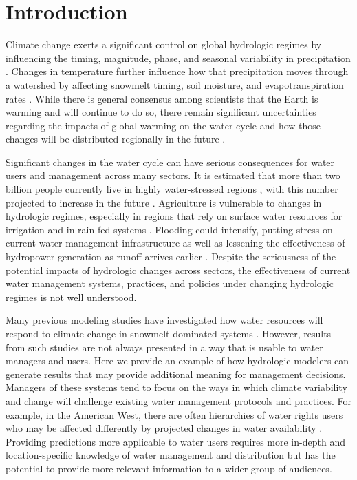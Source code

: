 \documentclass[water,article,submit,moreauthors,pdftex,10pt,a4paper]{mdpi}
\theoremstyle{mdpi}
\newcounter{ex}
\newcounter{re}
\theoremstyle{mdpidefinition}
\begin{document}


\section{Introduction}
Climate change exerts a significant control on global hydrologic regimes by influencing the timing, magnitude, phase, and seasonal variability in precipitation \citep{Mote:2005bv,Regonda:2005bl,Knowles:2006jc,Haddeland:2014kx}. Changes in temperature further influence how that precipitation moves through a watershed by affecting snowmelt timing, soil moisture, and evapotranspiration rates \citep{Barnett:2005ci,Li:2017jn}. While there is general consensus among scientists that the Earth is warming and will continue to do so, there remain significant uncertainties regarding the impacts of global warming on the water cycle and how those changes will be distributed regionally in the future \citep{Huntington:2006tl,Turral:2011uj}.

Significant changes in the water cycle can have serious consequences for water users and management across many sectors. It is estimated that more than two billion people currently live in highly water-stressed regions \citep{Oki:2006cu}, with this number projected to increase in the future \citep{Schewe:2014er}. Agriculture is vulnerable to changes in hydrologic regimes, especially in regions that rely on surface water resources for irrigation and in rain-fed systems \citep{Turral:2011uj}. Flooding could intensify, putting stress on current water management infrastructure as well as lessening the effectiveness of hydropower generation as runoff arrives earlier \citep{Markoff:2008tk}. Despite the seriousness of the potential impacts of hydrologic changes across sectors, the effectiveness of current water management systems, practices, and policies under changing hydrologic regimes is not well understood.

Many previous modeling studies have investigated how water resources will respond to climate change in snowmelt-dominated systems \citep{Adam:2009ie, Jin:2011ii, Ficklin:2013js, Gergel:2017vj}. However, results from such studies are not always presented in a way that is usable to water managers and users. Here we provide an example of how hydrologic modelers can generate results that may provide additional meaning for management decisions. Managers of these systems tend to focus on the ways in which climate variability and change will challenge existing water management protocols and practices. For example, in the American West, there are often hierarchies of water rights users who may be affected differently by projected changes in water availability \citep{Vicuna:2007gj}. Providing predictions more applicable to water users requires more in-depth and location-specific knowledge of water management and distribution but has the potential to provide more relevant information to a wider group of audiences. 
\end{document}
